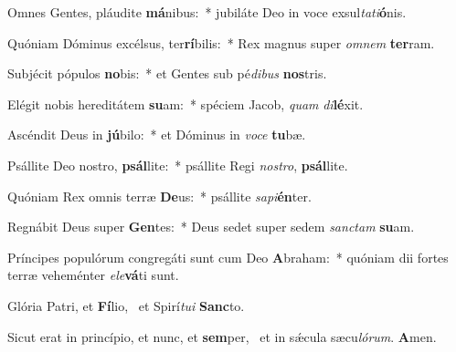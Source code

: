 \item Omnes Gentes, pláudite \textbf{má}nibus:~* jubiláte Deo in voce exsul\textit{ta}\textit{ti}\textbf{ó}nis.
\item Quóniam Dóminus excélsus, ter\textbf{rí}bilis:~* Rex magnus super \textit{om}\textit{nem} \textbf{ter}ram.
\item Subjécit pópulos \textbf{no}bis:~* et Gentes sub pé\textit{di}\textit{bus} \textbf{nos}tris.
\item Elégit nobis hereditátem \textbf{su}am:~* spéciem Jacob, \textit{quam} \textit{di}\textbf{lé}xit.
\item Ascéndit Deus in \textbf{jú}bilo:~* et Dóminus in \textit{vo}\textit{ce} \textbf{tu}bæ.
\item Psállite Deo nostro, \textbf{psál}lite:~* psállite Regi \textit{nos}\textit{tro}, \textbf{psál}lite.
\item Quóniam Rex omnis terræ \textbf{De}us:~* psállite \textit{sa}\textit{pi}\textbf{én}ter.
\item Regnábit Deus super \textbf{Gen}tes:~* Deus sedet super sedem \textit{sanc}\textit{tam} \textbf{su}am.
\item Príncipes populórum congre\-gáti sunt cum Deo \textbf{A}braham:~* quóniam dii fortes terræ veheménter \textit{e}\textit{le}\textbf{vá}ti sunt.
\item Glória Patri, et \textbf{Fí}lio,~\psstar{} et Spirí\textit{tu}\textit{i} \textbf{Sanc}to.
\item Sicut erat in princípio, et nunc, et \textbf{sem}per,~\psstar{} et in sǽcula sæcu\textit{ló}\textit{rum}. \textbf{A}men.
